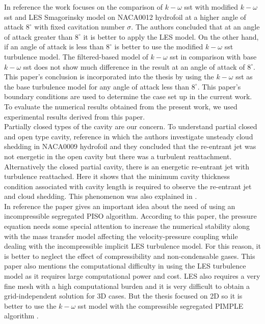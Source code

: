 In reference \cite{Zhao2021} the work focuses on the comparison of $k-\omega $ sst 
 with modified  $k-\omega$ sst and LES Smagorinsky model on NACA0012 hydrofoil at a 
higher angle of attack $8^{\circ}$ with fixed cavitation number $\sigma$. The authors 
concluded that at an angle of attack greater than $8^\circ$ it is better to apply 
the LES model. On the other hand, if an angle of attack is less than $8^\circ$ is 
better to use the modified $k-\omega$ sst turbulence model. The filtered-based 
model of $k-\omega $ sst in comparison with base $k-\omega$ sst does not show much 
difference in the result at an angle of attack of $8^{\circ}$. This paper's conclusion 
is incorporated into the thesis by using the $k-\omega$ sst as the base turbulence model 
for any angle of attack less than $8^{\circ}$. This paper's boundary conditions are used 
to determine the case set up in the current work. To evaluate the numerical results 
obtained from the present work, we used experimental results derived from this paper.\\

Partially closed types of the cavity are our concern.  To understand partial
closed and open type cavity, reference \cite{ceccio2001} in which the authors
investigate unsteady cloud shedding in NACA0009 hydrofoil and
they concluded that the re-entrant jet was not energetic in the open cavity
but there was a turbulent reattachment. Alternatively the closed partial
cavity, there is an energetic re-entrant jet with turbulence
reattached. Here it shows that the minimum cavity thickness condition
associated with cavity length is required to observe the re-entrant
jet and cloud shedding. This phenomenon was also explained in
\cite{FundamentalsofCavitation.2004}.\\

In reference \cite{Bensow2010} the paper gives an important idea about
the need of using an incompressible segregated PISO algorithm. According
to this paper, the pressure equation needs some special attention to
increase the numerical stability along with the mass transfer model
affecting the velocity-pressure coupling while dealing with the
incompressible implicit LES turbulence model. For this reason, it is
better to neglect the effect of compressibility and non-condensable
gases. This paper also mentions the computational difficulty in using the LES
turbulence model as it requires large computational power and
cost. LES also requires a very fine mesh with a high computational
burden and it is very difficult to obtain a grid-independent solution
\cite{ZHANG2017} for 3D cases. But the thesis focused on 2D so it is
better to use the $k-\omega $ sst model with the compressible
segregated PIMPLE algorithm \cite{Zhao2021}.\\

